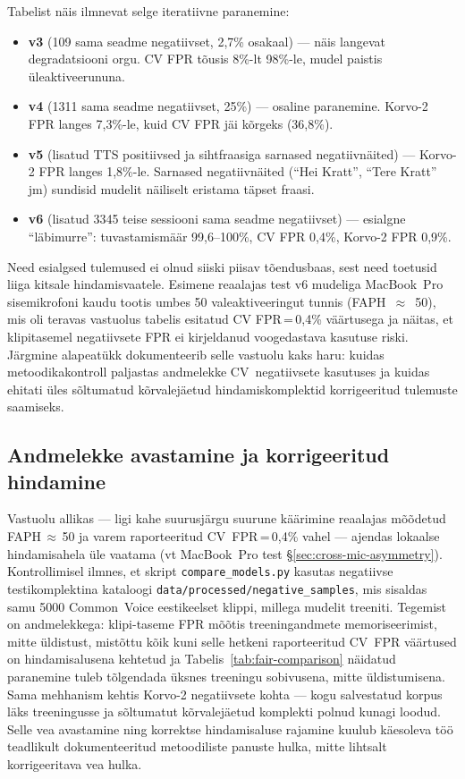 Tabelist näis ilmnevat selge iteratiivne paranemine:

\begin{itemize}
    \item \textbf{v3} (109 sama seadme negatiivset, 2,7\% osakaal) --- näis langevat degradatsiooni orgu. CV FPR tõusis 8\%-lt 98\%-le, mudel paistis üleaktiveerununa.
    \item \textbf{v4} (1311 sama seadme negatiivset, 25\%) --- osaline paranemine. Korvo-2 FPR langes 7,3\%-le, kuid CV FPR jäi kõrgeks (36,8\%).
    \item \textbf{v5} (lisatud TTS positiivsed ja sihtfraasiga sarnased negatiivnäited) --- Korvo-2 FPR langes 1,8\%-le. Sarnased negatiivnäited (\enquote{Hei Kratt}, \enquote{Tere Kratt} jm) sundisid mudelit näiliselt eristama täpset fraasi.
    \item \textbf{v6} (lisatud 3345 teise sessiooni sama seadme negatiivset) --- esialgne \enquote{läbimurre}: tuvastamismäär 99,6--100\%, CV FPR 0,4\%, Korvo-2 FPR 0,9\%.
\end{itemize}

Need esialgsed tulemused ei olnud siiski piisav tõendusbaas, sest need toetusid liiga kitsale hindamisvaatele. Esimene reaalajas test v6 mudeliga MacBook~Pro sisemikrofoni kaudu tootis umbes 50 valeaktiveeringut tunnis (FAPH~$\approx$~50), mis oli teravas vastuolus tabelis esitatud CV FPR\,=\,0,4\% väärtusega ja näitas, et klipitasemel negatiivsete FPR ei kirjeldanud voogedastava kasutuse riski. Järgmine alapeatükk dokumenteerib selle vastuolu kaks haru: kuidas metoodikakontroll paljastas andmelekke CV~negatiivsete kasutuses ja kuidas ehitati üles sõltumatud kõrvalejäetud hindamiskomplektid korrigeeritud tulemuste saamiseks.

\subsection{Andmelekke avastamine ja korrigeeritud hindamine}
\label{sec:data-leakage}

Vastuolu allikas --- ligi kahe suurusjärgu suurune käärimine reaalajas mõõdetud FAPH\,$\approx$\,50 ja varem raporteeritud CV~FPR\,=\,0,4\% vahel --- ajendas lokaalse hindamisahela üle vaatama (vt MacBook~Pro test §\ref{sec:cross-mic-asymmetry}). Kontrollimisel ilmnes, et skript \texttt{compare\_models.py} kasutas negatiivse testikomplektina kataloogi \texttt{data/processed/negative\_samples}, mis sisaldas samu 5000 Common~Voice eestikeelset klippi, millega mudelit treeniti. Tegemist on andmelekkega: klipi-taseme FPR mõõtis treeningandmete memoriseerimist, mitte üldistust, mistõttu kõik kuni selle hetkeni raporteeritud CV~FPR väärtused on hindamisalusena kehtetud ja Tabelis~\ref{tab:fair-comparison} näidatud paranemine tuleb tõlgendada üksnes treeningu sobivusena, mitte üldistumisena. Sama mehhanism kehtis Korvo-2 negatiivsete kohta --- kogu salvestatud korpus läks treeningusse ja sõltumatut kõrvalejäetud komplekti polnud kunagi loodud. Selle vea avastamine ning korrektse hindamisaluse rajamine kuulub käesoleva töö teadlikult dokumenteeritud metoodiliste panuste hulka, mitte lihtsalt korrigeeritava vea hulka.

